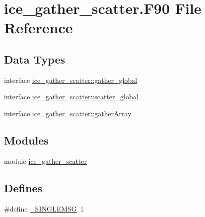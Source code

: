 \hypertarget{ice__gather__scatter_8F90}{
\section{ice\_\-gather\_\-scatter.F90 File Reference}
\label{ice__gather__scatter_8F90}
}
\subsection*{Data Types}
\begin{DoxyCompactItemize}
\item 
interface \hyperlink{interfaceice__gather__scatter_1_1gather__global}{ice\_\-gather\_\-scatter::gather\_\-global}
\item 
interface \hyperlink{interfaceice__gather__scatter_1_1scatter__global}{ice\_\-gather\_\-scatter::scatter\_\-global}
\item 
interface \hyperlink{interfaceice__gather__scatter_1_1gatherArray}{ice\_\-gather\_\-scatter::gatherArray}
\end{DoxyCompactItemize}
\subsection*{Modules}
\begin{DoxyCompactItemize}
\item 
module \hyperlink{namespaceice__gather__scatter}{ice\_\-gather\_\-scatter}
\end{DoxyCompactItemize}
\subsection*{Defines}
\begin{DoxyCompactItemize}
\item 
\#define \hyperlink{ice__gather__scatter_8F90_a1f575c320f2236b7ff09f848037bf839}{\_\-SINGLEMSG}~1
\end{DoxyCompactItemize}
